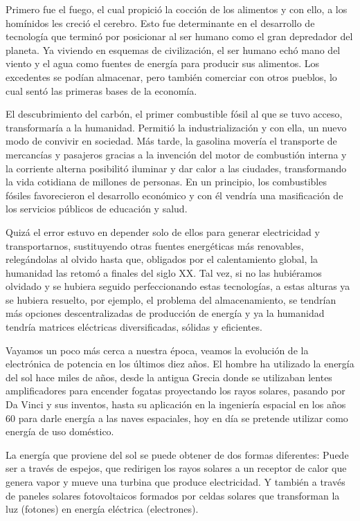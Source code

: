 \documentclass[12pt,letterpaper,superscriptaddress]{article}
\begin{document}

Primero fue el fuego, el cual propició la cocción de los alimentos y con ello, a los homínidos les creció el cerebro. Esto fue determinante en el desarrollo de tecnología que terminó por posicionar al ser humano como el gran depredador del planeta. Ya viviendo en esquemas de civilización, el ser humano echó mano del viento y el agua como fuentes de energía para producir sus alimentos. Los excedentes se podían almacenar, pero también comerciar con otros pueblos, lo cual sentó las primeras bases de la economía.

El descubrimiento del carbón, el primer combustible fósil al que se tuvo acceso, transformaría a la humanidad. Permitió la industrialización y con ella, un nuevo modo de convivir en sociedad. Más tarde, la gasolina movería el transporte de mercancías y pasajeros gracias a la invención del motor de combustión interna y la corriente alterna posibilitó iluminar y dar calor a las ciudades, transformando la vida cotidiana de millones de personas. En un principio, los combustibles fósiles favorecieron el desarrollo económico y con él vendría una masificación de los servicios públicos de educación y salud.

Quizá el error estuvo en depender solo de ellos para generar electricidad y transportarnos, sustituyendo otras fuentes energéticas más renovables, relegándolas al olvido hasta que, obligados por el calentamiento global, la humanidad las retomó a finales del siglo XX. Tal vez, si no las hubiéramos olvidado y se hubiera seguido perfeccionando estas tecnologías, a estas alturas ya se hubiera resuelto, por ejemplo, el problema del almacenamiento, se tendrían más opciones descentralizadas de producción de energía y ya la humanidad tendría matrices eléctricas diversificadas, sólidas y eficientes.


Vayamos un poco más cerca a nuestra época, veamos la evolución de la electrónica de potencia en los últimos diez años. El hombre ha utilizado la energía del sol hace miles de años, desde la antigua Grecia donde se utilizaban lentes amplificadores para encender fogatas proyectando los rayos solares, pasando por Da Vinci y sus inventos, hasta su aplicación en la ingeniería espacial en los años 60 para darle energía a las naves espaciales, hoy en día se pretende utilizar como energía de uso doméstico.

La energía que proviene del sol se puede obtener de dos formas diferentes: Puede ser a través de espejos, que redirigen los rayos solares a un receptor de calor que genera vapor y mueve una turbina que produce electricidad. Y también a través de paneles solares fotovoltaicos formados por celdas solares que transforman la luz (fotones) en energía eléctrica (electrones).
\end{document}
